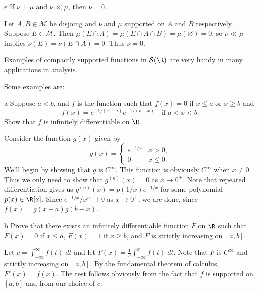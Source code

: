 \documentclass[11pt,letterpaper]{article}
\def\S{\mathcal{S}}
\def\M{\mathcal{M}}
\begin{document}
\begin{solution}
\begin{partproblem}{e} If $\nu \perp \mu$ and $\nu \ll \mu$, then $\nu = 0$.\end{partproblem}
    Let $A,B \in \M$ be disjoing and $\nu$ and $\mu$ supported on $A$ and $B$ respectively. Suppose $E \in \M$. Then $\mu(E \cap A) = \mu(E \cap A \cap B) = \mu(\varnothing)=0$, so $\nu \ll \mu$ implies $\nu(E) = \nu(E \cap A) = 0$. Thus $\nu = 0$.
\end{solution}

\begin{problem}
    Examples of compactly supported functions in $\S(\R)$ are very handy in many applications in analysis.
\end{problem}

\begin{solution}
    Some examples are:
    \begin{partproblem}{a}
        Suppose $a < b$, and $f$ is the function such that $f(x)=0$ if $x \leq a$ or $x \geq b$ and
    \[
    f(x)=e^{-1/(x-a)}e^{-1/(b-x)}\quad\text{if}\;a<x<b.
    \]
    Show that $f$ is infinitely differentiable on $\R$.
    \end{partproblem}

    \quad Consider the function $g(x)$ given by
    \[
        g(x)=\begin{cases}
            e^{-1 /x}& x > 0,\\
            0 & x \leq 0.
        \end{cases}
    \] 
    We'll begin by showing that $g$ is $C^\infty$. This function is obviously $C^\infty$ when $x\neq 0$. Thus we only need to show that $g^{(n)}(x)=0$ as $x\to 0^+$. Note that repeated differentiation gives us $g^{(n)}(x)=p(1 /x)e^{-1 /x}$ for some polynomial $p(x)\in \R[x]$. Since $e^{-1 /x} / x^n \to 0$ as $x\mapsto 0^+$, we are done, since $f(x)=g(x-a)g(b-x)$.

    \begin{partproblem}{b}
        Prove that there exists an infinitely differentiable function $F$ on $\R$ such that $F(x)=0$ if $x \leq a$, $F(x)=1$ if $x \geq b$, and $F$ is strictly increasing on $[a,b]$.
    \end{partproblem}

    \quad Let $c=\int^\infty_{-\infty} f(t)\;dt$ and let $F(x)=\frac{1}{c}\int^x_{-\infty}f(t)\;dt$. Note that $F$ is $C^\infty$ and strictly increasing on $[a, b]$. By the fundamental theorem of calculus, $F'(x)=f(x)$. The rest follows obviously from the fact that $f$ is supported on $[a,b]$ and from our choice of $c$. 
    

\end{solution}
\end{document}
